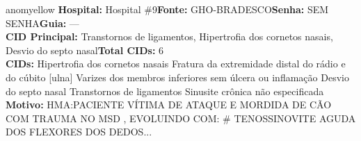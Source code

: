 \documentclass[a4paper,10pt]{article}
\begin{document}
\begin{anomalycard}[Interna\c{c}\~{a}o \#119857 | Pac. \#99399 | MODERADO (z=2.12) | LOS: 3d | 02/03/2026\,$\to$\,05/03/2026]{anomyellow}
\textbf{Hospital:} Hospital \#9\quad \textbf{Fonte:} GHO-BRADESCO\quad \textbf{Senha:} SEM SENHA\quad \textbf{Guia:} ---\\

\textbf{CID Principal:} {\small Transtornos de ligamentos, Hipertrofia dos cornetos nasais, Desvio do septo nasal}\quad\textbf{Total CIDs:} 6\\

\textbf{CIDs:} {\scriptsize Hipertrofia dos cornetos nasais \textbar{} Fratura da extremidade distal do rádio e do cúbito [ulna] \textbar{} Varizes dos membros inferiores sem úlcera ou inflamação \textbar{} Desvio do septo nasal \textbar{} Transtornos de ligamentos \textbar{} Sinusite crônica não especificada}\\

\textbf{Motivo:} {\scriptsize HMA:PACIENTE VÍTIMA DE ATAQUE E MORDIDA DE CÃO COM TRAUMA NO MSD ,  EVOLUINDO COM:  \# TENOSSINOVITE AGUDA DOS FLEXORES DOS DEDOS...}\\




\end{anomalycard}
\end{document}
